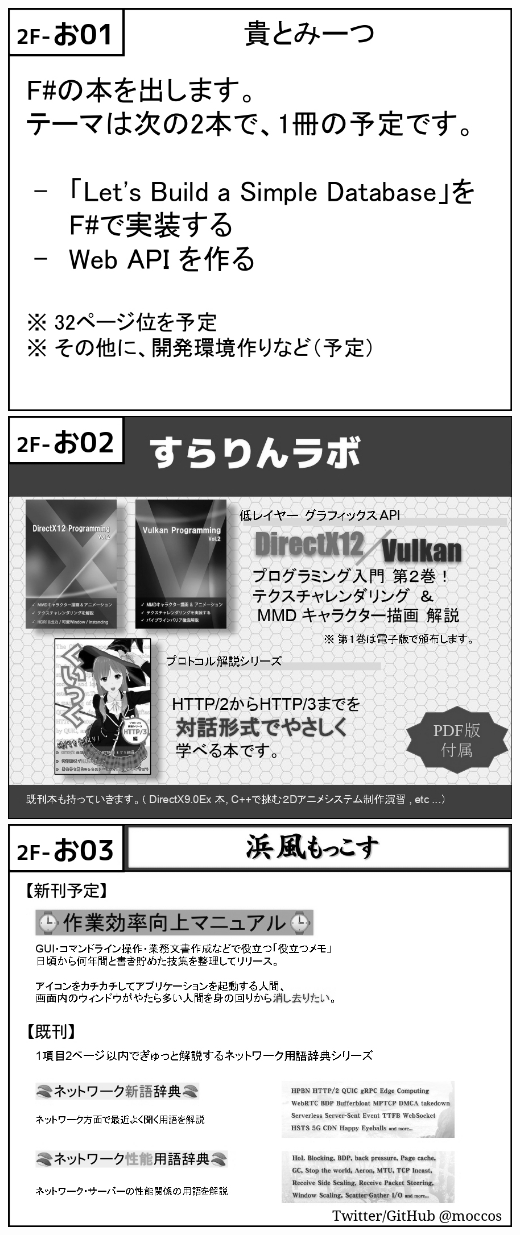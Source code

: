 \begin{center}
\includegraphics[width=0.9\linewidth]{images/circle-appeals/2F-お01.jpg}
\includegraphics[width=0.9\linewidth]{images/circle-appeals/2F-お02.jpg}
\includegraphics[width=0.9\linewidth]{images/circle-appeals/2F-お03.jpg}

\end{center}
